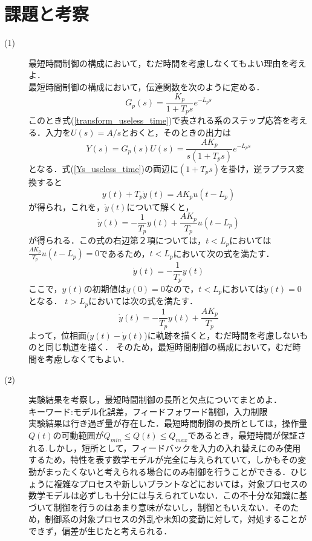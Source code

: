 \documentclass[12pt]{jsarticle}
\begin{document}
\section{課題と考察}
\begin{description}
\item[(1)]最短時間制御の構成において，むだ時間を考慮しなくてもよい理由を考えよ．\\
最短時間制御の構成において，伝達関数を次のように定める．
\begin{equation}
  \label{transform_useless_time}
  G_p(s) = \frac{K_p}{1+T_ps} e^{-L_ps}
\end{equation}
このとき式(\ref{transform_useless_time})で表される系のステップ応答を考える．入力を$U(s)=A/s$とおくと，そのときの出力は
\begin{equation}
  \label{Ys_useless_time}
  Y(s) = G_p(s)U(s) = \frac{AK_p}{s(1+T_ps)} e^{-L_ps}
\end{equation}
となる．式(\ref{Ys_useless_time})の両辺に$(1+T_ps)$を掛け，逆ラプラス変換すると
\begin{equation}
  y(t) + T_p\dot{y}(t) = AK_pu(t-L_p)
\end{equation}
が得られ，これを，$\dot{y}(t)$について解くと，
\begin{equation}
  \dot{y}(t) = -\frac{1}{T_p}y(t) + \frac{AK_p}{T_p}u(t-L_p)
\end{equation}
が得られる．この式の右辺第２項については，$t < L_p$においては$\frac{AK_p}{T_p}u(t-L_p)=0$であるため，$t < L_p$において次の式を満たす．
\begin{equation}
  \dot{y}(t) = -\frac{1}{T_p}y(t)
\end{equation}
ここで，$y(t)$の初期値は$y(0)=0$なので，$t < L_p$においては$\dot{y}(t)=0$となる．
$t > L_p$においては次の式を満たす．
\begin{equation}
  \dot{y}(t) = -\frac{1}{T_p}y(t) + \frac{AK_p}{T_p}
\end{equation}
よって，位相面($y(t) - \dot{y}(t)$)に軌跡を描くと，むだ時間を考慮しないものと同じ軌道を描く．
そのため，最短時間制御の構成において，むだ時間を考慮しなくてもよい．
\item[(2)]実験結果を考察し，最短時間制御の長所と欠点についてまとめよ．\\
キーワード:モデル化誤差，フィードフォワード制御，入力制限\\
  実験結果は行き過ぎ量が存在した．最短時間制御の長所としては，操作量$Q(t)$の可動範囲が$Q_{min} \leq Q(t) \leq Q_{max}$であるとき，最短時間が保証される\cite{process_control}.しかし，短所として，フィードバックを入力の入れ替えにのみ使用するため，特性を表す数学モデルが完全に与えられていて，しかもその変動がまったくないと考えられる場合にのみ制御を行うことができる．ひじょうに複雑なプロセスや新しいプラントなどにおいては，対象プロセスの数学モデルは必ずしも十分には与えられていない．この不十分な知識に基づいて制御を行うのはあまり意味がないし，制御ともいえない\cite{optimal_controll_theory}．そのため，制御系の対象プロセスの外乱や未知の変動に対して，対処することができず，偏差が生じたと考えられる．
\end{description}
\end{document}
